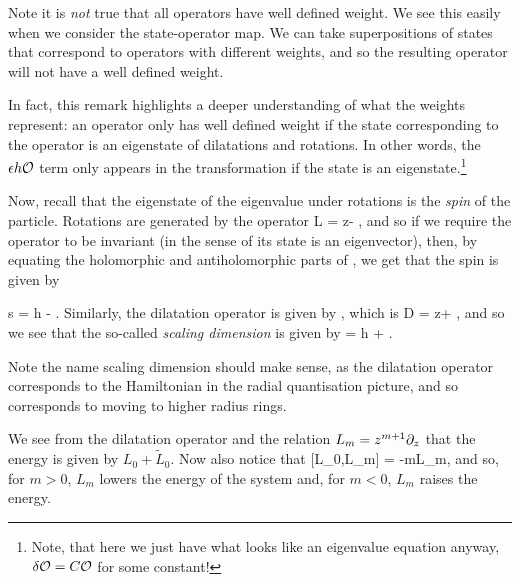 \br 
    Note it is \textit{not} true that all operators have well defined weight. We see this easily when we consider the state-operator map. We can take superpositions of states that correspond to operators with different weights, and so the resulting operator will not have a well defined weight. 
\er 

In fact, this remark highlights a deeper understanding of what the weights represent: an operator only has well defined weight if the state corresponding to the operator is an eigenstate of dilatations and rotations. In other words, the $\epsilon h\mathcal{O}$ term only appears in the transformation if the state is an eigenstate.\footnote{Note, that here we just have what looks like an eigenvalue equation anyway, $\delta \mathcal{O} = C\mathcal{O}$ for some constant!} 

Now, recall that the eigenstate of the eigenvalue under rotations is the \textit{spin} of the particle. Rotations are generated by the operator 
\bse 
    L = z\p - \overline{\p},
\ese 
and so if we require the operator to be invariant (in the sense of its state is an eigenvector), then, by equating the holomorphic and antiholomorphic parts of , we get that the spin is given by

\be 
\label{eqn:SpinWeights}
    s = h - .
\ee 
Similarly, the dilatation operator is given by , which is 
\bse 
    D = z\p + \overline{\p},
\ese
and so we see that the so-called \textit{scaling dimension} is given by 
\be 
\label{eqn:ScalingDimension}
    \Delta = h + .
\ee 

\br 
    Note the name scaling dimension should make sense, as the dilatation operator corresponds to the Hamiltonian in the radial quantisation picture, and so corresponds to moving to higher radius rings. 
\er 

\br 
    We see from the dilatation operator and the relation $L_m = z^{m+1}\partial_z$ that the energy is given by $L_0 +\widetilde{L}_0$. Now also notice that 
    \be 
    \label{eqn:L0LmCommutator}
        [L_0,L_m] = -mL_m,
    \ee 
    and so, for $m>0$, $L_m$ lowers the energy of the system and, for $m<0$, $L_m$ raises the energy.
\er 


